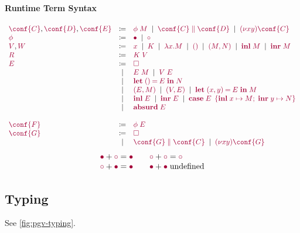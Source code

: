 \documentclass[main.tex]{subfiles}
\begin{document}
\paragraph*{Runtime Term Syntax}
\[
\begin{array}[t]{lcl}
  \tm{\conf{C}}, \tm{\conf{D}}, \tm{\conf{E}}
  & \coloneqq & \tm{\phi\;M}
    \sep        \tm{\ppar{\conf{C}}{\conf{D}}}
    \sep        \tm{\res{x}{y}{\conf{C}}}
  \\
  \tm{\phi}
  & \coloneqq & \tm{\main}
    \sep        \tm{\child}
  \\
  \tm{V}, \tm{W}
  & \coloneqq & \tm{x}
    \sep        \tm{K}
    \sep        \tm{\lambda x.M}
    \sep        \tm{\unit}
    \sep        \tm{\pair{M}{N}}
    \sep        \tm{\inl{M}}
    \sep        \tm{\inr{M}}
  \\
  \tm{R}
  & \coloneqq & \tm{K\;V}
  \\
  \tm{E}
  & \coloneqq & \tm{\hole} \\
  & \sep      & \tm{E\;M}
    \sep        \tm{V\;E} \\
  & \sep      & \tm{\letunit{E}{N}} \\
  & \sep      & \tm{\pair{E}{M}}
    \sep        \tm{\pair{V}{E}}
    \sep        \tm{\letpair{x}{y}{E}{M}} \\
  & \sep      & \tm{\inl{E}}
    \sep        \tm{\inr{E}}
    \sep        \tm{\casesum{E}{x}{M}{y}{N}} \\
  & \sep      & \tm{\absurd{E}} \\
  \\
  \tm{\conf{F}}
  & \coloneqq & \tm{\phi\;E}
  \\
  \tm{\conf{G}}
  & \coloneqq & \tm{\hole} \\
  & \sep      & \tm{\ppar{\conf{G}}{\conf{C}}}
    \sep        \tm{\res{x}{y}{\conf{G}}}
\end{array}
\]
\[
\begin{array}{ll}
  \tm{\main}  + \tm{\child} = \tm{\main}
  \\
  \tm{\child} + \tm{\main}  = \tm{\main}
\end{array}
\quad
\begin{array}{ll}
  \tm{\child} + \tm{\child} = \tm{\child}
  \\
  \tm{\main}  + \tm{\main} \; \text{undefined}
\end{array}
\]

\subsection{Typing}
See \cref{fig:pgv-typing}.

\end{document}
